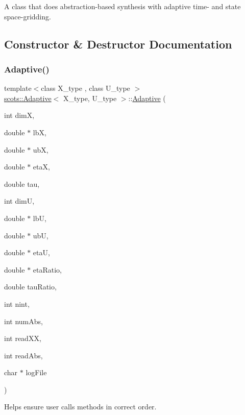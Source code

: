 A class that does abstraction-\/based synthesis with adaptive time-\/ and state space-\/gridding. 

\subsection{Constructor \& Destructor Documentation}
\mbox{\label{classscots_1_1Adaptive_a5665d4b8db7cc7c1e1ecba0a512959d7}} 
\subsubsection{\texorpdfstring{Adaptive()}{Adaptive()}}
{\footnotesize\ttfamily template$<$class X\+\_\+type , class U\+\_\+type $>$ \\
\hyperlink{classscots_1_1Adaptive}{scots\+::\+Adaptive}$<$ X\+\_\+type, U\+\_\+type $>$\+::\hyperlink{classscots_1_1Adaptive}{Adaptive} (\begin{DoxyParamCaption}\item[{int}]{dimX,  }\item[{double $\ast$}]{lbX,  }\item[{double $\ast$}]{ubX,  }\item[{double $\ast$}]{etaX,  }\item[{double}]{tau,  }\item[{int}]{dimU,  }\item[{double $\ast$}]{lbU,  }\item[{double $\ast$}]{ubU,  }\item[{double $\ast$}]{etaU,  }\item[{double $\ast$}]{eta\+Ratio,  }\item[{double}]{tau\+Ratio,  }\item[{int}]{nint,  }\item[{int}]{num\+Abs,  }\item[{int}]{read\+XX,  }\item[{int}]{read\+Abs,  }\item[{char $\ast$}]{log\+File }\end{DoxyParamCaption})\hspace{0.3cm}{\ttfamily [inline]}}

Helps ensure user calls methods in correct order.

